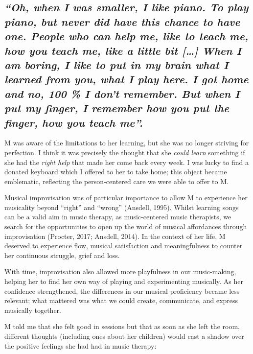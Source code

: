 \documentclass[authordate, empirical]{jote-new-article}
\begin{document}
\subsection{\emph{“Oh, when I was smaller, I like piano. To play piano, but never did have this chance to have one. People who can help me, like to teach me, how you teach me, like a little bit […] When I am boring, I like to put in my brain what I learned from you, what I play here. I got home and no, 100 \% I don't remember. But when I put my finger, I remember how you put the finger, how you teach me”.}}







M was aware of the limitations to her learning, but she was no longer striving for perfection. I think it was precisely the thought that she \emph{could learn }something if she had the \emph{right help} that made her come back every week. I was lucky to find a donated keyboard which I offered to her to take home; this object became emblematic, reflecting the person-centered care we were able to offer to M.







Musical improvisation was of particular importance to allow M to experience her musicality beyond “right” and “wrong” (Ansdell, 1995). Whilst learning songs can be a valid aim in music therapy, as music-centered music therapists, we search for the opportunities to open up the world of musical affordances through improvisation (Procter, 2017; Ansdell, 2014). In the context of her life, M deserved to experience flow, musical satisfaction and meaningfulness to counter her continuous struggle, grief and loss.







With time, improvisation also allowed more playfulness in our music-making, helping her to find her own way of playing and experimenting musically. As her confidence strengthened, the differences in our musical proficiency became less relevant; what mattered was what we could create, communicate, and express musically together.







M told me that she felt good in sessions but that as soon as she left the room, different thoughts (including ones about her children) would cast a shadow over the positive feelings she had had in music therapy:
\end{document}

